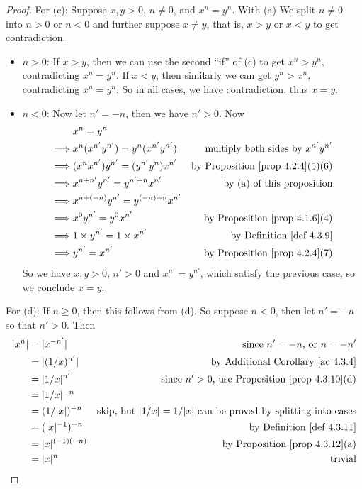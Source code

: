 \begin{proof}
For (c): Suppose \(x, y > 0\), \(n \neq 0\), and \(x^n = y^n\).
With (a) We split \(n \neq 0\) into \(n > 0\) or \(n < 0\) and further suppose \(x \neq y\), that is, \(x > y\) or \(x < y\) to get contradiction.
\begin{itemize}
    \item \(n > 0\):
        If \(x > y\), then we can use the second ``if'' of (c) to get \(x^n > y^n\), contradicting \(x^n = y^n\).
        If \(x < y\), then similarly we can get \(y^n > x^n\), contradicting \(x^n = y^n\).
        So in all cases, we have contradiction, thus \(x = y\).
    \item \(n < 0\):
        Now let \(n' = -n\), then we have \(n' > 0\).
        Now
        \begin{align*}
                     & x^n = y^n \\
            \implies & x^n (x^{n'}y^{n'}) = y^n (x^{n'}y^{n'}) & \text{multiply both sides by \(x^{n'}y^{n'}\)} \\
            \implies & (x^n x^{n'})y^{n'} = (y^{n'}y^n) x^{n'} & \text{by \PROP{4.2.4}(5)(6)} \\
            \implies & x^{n + n'}y^{n'} = y^{n' + n} x^{n'} & \text{by (a) of this proposition} \\
            \implies & x^{n + (-n)}y^{n'} = y^{(-n) + n} x^{n'} \\
            \implies & x^0 y^{n'} = y^0 x^{n'} & \text{by \PROP{4.1.6}(4)} \\
            \implies & 1 \X y^{n'} = 1 \X x^{n'} & \text{by \DEF{4.3.9}} \\
            \implies & y^{n'} = x^{n'} & \text{by \PROP{4.2.4}(7)}
        \end{align*}
        So we have \(x, y > 0\), \(n' > 0\) and \(x^{n'} = y^{n'}\), which satisfy the previous case, so we conclude \(x = y\).
\end{itemize}

For (d):
If \(n \ge 0\), then this follows from (d).
So suppose \(n < 0\), then let \(n' = -n\) so that \(n' > 0\).
Then
\begin{align*}
    \abs{x^n} & = \abs{x^{-n'}} & \text{since \(n' = -n\), or \(n = -n'\)} \\
              & = \abs{(1/x)^{n'}} & \text{by \AC{4.3.4}} \\
              & = \abs{1/x}^{n'} & \text{since \(n' > 0\), use \PROP{4.3.10}(d)} \\
              & = \abs{1/x}^{-n} \\
              & = (1/\abs{x})^{-n} & \text{skip, but \(\abs{1/x} = 1/\abs{x}\) can be proved by splitting into cases} \\
              & = (\abs{x}^{-1})^{-n} & \text{by \DEF{4.3.11}} \\
              & = \abs{x}^{(-1)(-n)} & \text{by \PROP{4.3.12}(a)} \\
              & = \abs{x}^n & \text{trivial}
\end{align*}
\end{proof}

